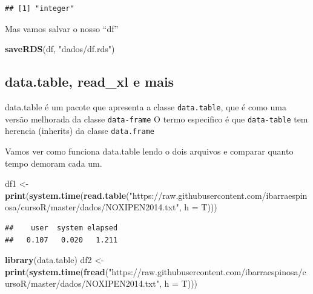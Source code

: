 \documentclass[]{book}
\newenvironment{Shaded}{\begin{snugshade}}{\end{snugshade}}
\newcommand{\KeywordTok}[1]{\textcolor[rgb]{0.13,0.29,0.53}{\textbf{#1}}}
\newcommand{\DataTypeTok}[1]{\textcolor[rgb]{0.13,0.29,0.53}{#1}}
\newcommand{\StringTok}[1]{\textcolor[rgb]{0.31,0.60,0.02}{#1}}
\newcommand{\NormalTok}[1]{#1}
\theoremstyle{definition}
\theoremstyle{definition}
\theoremstyle{definition}
\theoremstyle{remark}
\begin{document}
\begin{verbatim}
## [1] "integer"
\end{verbatim}

Mas vamos salvar o nosso ``df''

\begin{Shaded}
\begin{Highlighting}[]
\KeywordTok{saveRDS}\NormalTok{(df, }\StringTok{"dados/df.rds"}\NormalTok{)}
\end{Highlighting}
\end{Shaded}

\subsection{data.table, read\_xl e
mais}\label{data.table-read_xl-e-mais}

data.table é um pacote que apresenta a classe \texttt{data.table}, que é
como uma versão melhorada da classe \texttt{data-frame} O termo
especifico é que \texttt{data-table} tem herencia (inherits) da classe
\texttt{data.frame}

Vamos ver como funciona data.table lendo o dois arquivos e comparar
quanto tempo demoram cada um.

\begin{Shaded}
\begin{Highlighting}[]
\NormalTok{df1 <-}\StringTok{ }\KeywordTok{print}\NormalTok{(}\KeywordTok{system.time}\NormalTok{(}\KeywordTok{read.table}\NormalTok{(}\StringTok{"https://raw.githubusercontent.com/ibarraespinosa/cursoR/master/dados/NOXIPEN2014.txt"}\NormalTok{, }\DataTypeTok{h =}\NormalTok{ T)))}
\end{Highlighting}
\end{Shaded}

\begin{verbatim}
##    user  system elapsed 
##   0.107   0.020   1.211
\end{verbatim}

\begin{Shaded}
\begin{Highlighting}[]
\KeywordTok{library}\NormalTok{(data.table)}
\NormalTok{df2 <-}\StringTok{ }\KeywordTok{print}\NormalTok{(}\KeywordTok{system.time}\NormalTok{(}\KeywordTok{fread}\NormalTok{(}\StringTok{"https://raw.githubusercontent.com/ibarraespinosa/cursoR/master/dados/NOXIPEN2014.txt"}\NormalTok{, }\DataTypeTok{h =}\NormalTok{ T)))}
\end{Highlighting}
\end{Shaded}
\end{document}
